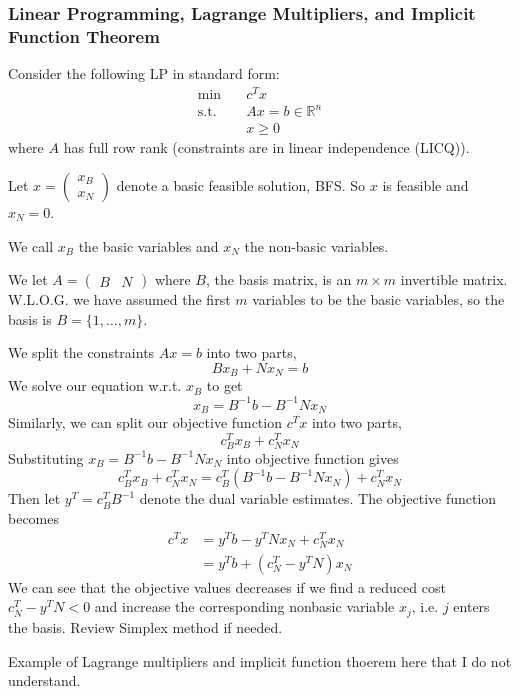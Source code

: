 \subsubsection{Linear Programming, Lagrange Multipliers, and Implicit Function Theorem}
\begin{example}
    Consider the following LP in standard form:
    \begin{align*}
        \min \quad & c^T x \\
        \text{s.t.} \quad & Ax = b \in \mathbb R^n\\
        & x \geq 0
    \end{align*}
    where $A$ has full row rank (constraints are in linear independence (LICQ)).

    Let $x = \begin{pmatrix}x_B \\ x_N \end{pmatrix}$ denote a basic feasible solution, BFS. So $x$ is feasible and $x_N = 0$. 
    
    We call $x_B$ the basic variables and $x_N$ the non-basic variables. 
    
    We let $A = \begin{pmatrix}B & N\end{pmatrix}$ where $B$, the basis matrix, is an $m \times m$ invertible matrix. W.L.O.G. we have assumed the first $m$ variables to be the basic variables, so the basis is $B = \{1,\ldots,m\}$.

    We split the constraints $Ax = b$ into two parts, $$Bx_B + Nx_N = b$$ 
    We solve our equation w.r.t. $x_B$ to get $$x_B = B^{-1}b - B^{-1}Nx_N$$
    Similarly, we can split our objective function $c^T x$ into two parts, $$c^T_B x_B + c^T_N x_N$$ Substituting $x_B = B^{-1}b - B^{-1}Nx_N$ into objective function gives
    $$c^T_B x_B + c^T_N x_N = c^T_B(B^{-1}b - B^{-1}Nx_N) + c^T_N x_N$$
    Then let $y^T = c^T_BB^{-1}$ denote the dual variable estimates. The objective function becomes
    \begin{align*}
        c^Tx &= y^Tb - y^TNx_N + c^T_Nx_N \\
        &= y^Tb + (c^T_N - y^TN)x_N
    \end{align*}
    We can see that the objective values decreases if we find a reduced cost $c^T_N - y^TN < 0$ and increase the corresponding nonbasic variable $x_j$, i.e. $j$ enters the basis. Review Simplex method if needed.
\end{example}
\begin{example}
    Example of Lagrange multipliers and implicit function thoerem here that I do not understand.
\end{example}
